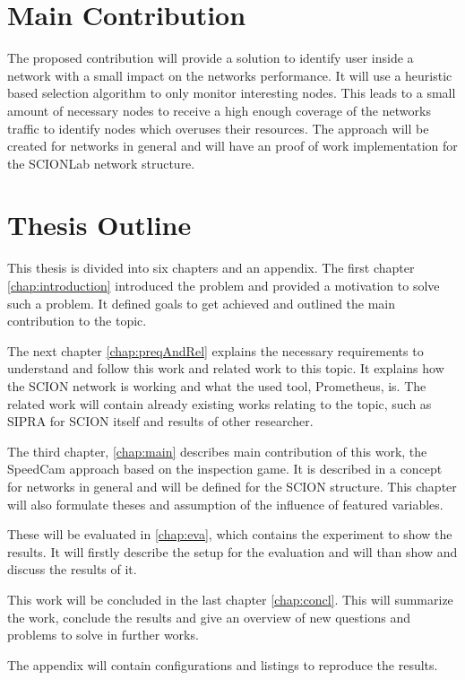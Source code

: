 \documentclass[thesis.tex]{subfiles}
\begin{document}
\section{Main Contribution}
The proposed contribution will provide a solution to identify user inside a network with a small impact on the networks performance. It will use a heuristic based selection algorithm to only monitor interesting nodes. This leads to a small amount of necessary nodes to receive a high enough coverage of the networks traffic to identify nodes which overuses their resources. The approach will be created for networks in general and will have an proof of work implementation for the SCIONLab network structure.

\section{Thesis Outline}
This thesis is divided into six chapters and an appendix. The first chapter \autoref{chap:introduction} introduced the problem and provided a motivation to solve such a problem. It defined goals to get achieved and outlined the main contribution to the topic.

The next chapter \autoref{chap:preqAndRel} explains the necessary requirements to understand and follow this work and related work to this topic. It explains how the SCION network is working and what the used tool, Prometheus, is. The related work will contain already existing works relating to the topic, such as SIPRA for SCION itself and results of other researcher. 

The third chapter, \autoref{chap:main} describes main contribution of this work, the SpeedCam approach based on the inspection game. It is described in a concept for networks in general and will be defined for the SCION structure. This chapter will also formulate theses and assumption of the influence of featured variables.

These will be evaluated in \autoref{chap:eva}, which contains the experiment to show the results. It will firstly describe the setup for the evaluation and will than show and discuss the results of it.

This work will be concluded in the last chapter \autoref{chap:concl}. This will summarize the work, conclude the results and give an overview of new questions and problems to solve in further works.

The appendix will contain configurations and listings to reproduce the results.

\subfilebib %
\end{document}

